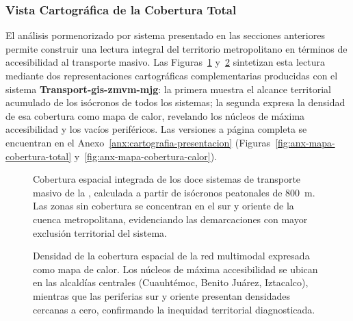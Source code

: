 \subsubsection{Vista Cartográfica de la Cobertura Total}
\label{subsubsec:cobertura-total-cartografia}

El análisis pormenorizado por sistema presentado en las secciones anteriores
permite construir una lectura integral del territorio metropolitano en términos
de accesibilidad al transporte masivo. Las
Figuras~\ref{fig:mapa-cobertura-red-total} y~\ref{fig:mapa-cobertura-calor}
sintetizan esta lectura mediante dos representaciones cartográficas complementarias
producidas con el sistema \textbf{Transport-gis-zmvm-mjg}: la primera muestra el
alcance territorial acumulado de los isócronos de todos los sistemas; la segunda
expresa la densidad de esa cobertura como mapa de calor, revelando los núcleos de
máxima accesibilidad y los vacíos periféricos. Las versiones a página completa se
encuentran en el Anexo~\ref{anx:cartografia-presentacion}
(Figuras~\ref{fig:anx-mapa-cobertura-total}
y~\ref{fig:anx-mapa-cobertura-calor}).

\begin{figure}[H]
    \centering
    \caption[Cobertura espacial total de la red multimodal — isócronas 800~m]{
    Cobertura espacial integrada de los doce sistemas de transporte masivo de la
    \zmvm{}, calculada a partir de isócronos peatonales de 800~m. Las zonas sin
    cobertura se concentran en el sur y oriente de la cuenca metropolitana,
    evidenciando las demarcaciones con mayor exclusión territorial del sistema.}
    \label{fig:mapa-cobertura-red-total}
\end{figure}

\begin{figure}[H]
    \centering
    \caption[Densidad de cobertura de la red multimodal — mapa de calor]{
    Densidad de la cobertura espacial de la red multimodal expresada como mapa
    de calor. Los núcleos de máxima accesibilidad se ubican en las alcaldías
    centrales (Cuauhtémoc, Benito Juárez, Iztacalco), mientras que las periferias
    sur y oriente presentan densidades cercanas a cero, confirmando la inequidad
    territorial diagnosticada.}
    \label{fig:mapa-cobertura-calor}
\end{figure}

